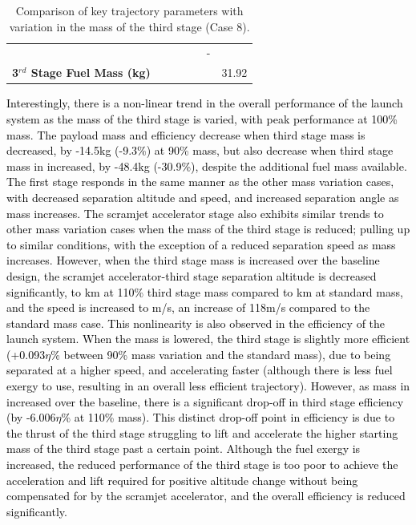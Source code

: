 \begin{table}[ht]
\begin{tabular}{l c c c c c c}
		& \thirdqOverFivemThreeNinetyFiveNoReturn
		& \thirdqOverFivemThreeStandardNoReturn
		& \thirdqOverFivemThreeOneHundredFiveNoReturn
		& \thirdqOverFivemThreeOneHundredTenNoReturn
		& -
		\\
		\textbf{3$^{rd}$ Stage Fuel Mass (kg)}
		& \thirdmFuelmThreeNinetyNoReturn
		& \thirdmFuelmThreeNinetyFiveNoReturn
		& \thirdmFuelmThreeStandardNoReturn
		& \thirdmFuelmThreeOneHundredFiveNoReturn
		& \thirdmFuelmThreeOneHundredTenNoReturn
		&31.92
		\\
		\hline 
	\end{tabular} 
	\caption{Comparison of key trajectory parameters with variation in the mass of the third stage (Case 8).}
	\label{tab:comparison80}
\end{table}


\textcolor{black}{Interestingly, there is a non-linear trend in the overall performance of the launch system as the mass of the third stage is varied, with peak performance at 100\% mass. The payload mass and efficiency decrease when third stage mass is decreased, by -14.5kg (-9.3\%) at 90\% mass, but also decrease when third stage mass in increased, by -48.4kg (-30.9\%), despite the additional fuel mass available. 
	The first stage responds in the same manner as the other mass variation cases, with decreased separation altitude and speed, and increased separation angle as mass increases. The scramjet accelerator stage also exhibits similar trends to other mass variation cases when the mass of the third stage is reduced; pulling up to similar conditions, with the exception of a reduced separation speed as mass increases. However, when the third stage mass is increased over the baseline design, the scramjet accelerator-third stage separation altitude is decreased significantly, to \secondthirdSeparationAltmThreeOneHundredTenNoReturn km at 110\% third stage mass compared to \secondthirdSeparationAltStandardNoReturn km at standard mass, and the speed is increased to \secondthirdSeparationvmThreeOneHundredTenNoReturn m/s, an increase of 118m/s compared to the standard mass case. This nonlinearity is also observed in the efficiency of the launch system. 
	When the mass is lowered, the third stage is slightly more efficient (+0.093$\eta$\% between 90\% mass variation and the standard mass), due to being separated at a higher speed, and accelerating faster (although there is less fuel exergy to use, resulting in an overall less efficient trajectory). 
	However, as mass in increased over the baseline, there is a significant drop-off in third stage efficiency (by -6.006$\eta$\% at 110\% mass). 
	This distinct drop-off point in efficiency is due to the thrust of the third stage struggling to lift and accelerate the higher starting mass of the third stage past a certain point. Although the fuel exergy is increased, the reduced performance of the third stage is too poor to achieve the acceleration and lift required for positive altitude change without being compensated for by the scramjet accelerator, and the overall efficiency is reduced significantly. 
}

